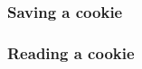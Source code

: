 \documentclass{beamer}
\begin{document}
	\frame
	{
		\frametitle{Saving a cookie}

		
	}
	
	\frame
	{
		\frametitle{Reading a cookie}

		
	}
\end{document}
